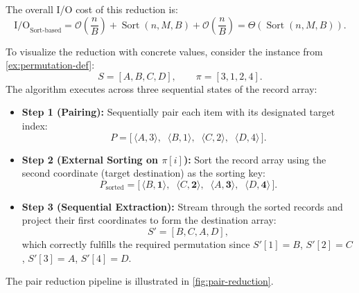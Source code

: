 The overall I/O cost of this reduction is:
\begin{equation}
  \mathrm{I/O}_{\text{Sort-based}} = \mathcal{O}\left(\frac{n}{B}\right) + \operatorname{Sort}(n, M, B) + \mathcal{O}\left(\frac{n}{B}\right) = \Theta(\operatorname{Sort}(n, M, B)).
\end{equation}

\begin{example}
\label{ex:pair-reduction-trace}
To visualize the reduction with concrete values, consider the instance from \autoref{ex:permutation-def}:
\[
  S = [A, B, C, D], \qquad \pi = [3, 1, 2, 4].
\]
The algorithm executes across three sequential states of the record array:
\begin{itemize}
  \item \textbf{Step 1 (Pairing):} Sequentially pair each item with its designated target index:
  \[
    P = \big[ \, \langle A, 3 \rangle, \;\; \langle B, 1 \rangle, \;\; \langle C, 2 \rangle, \;\; \langle D, 4 \rangle \, \big].
  \]
  \item \textbf{Step 2 (External Sorting on $\pi[i]$):} Sort the record array using the second coordinate (target destination) as the sorting key:
  \[
    P_{\text{sorted}} = \big[ \, \langle B, \mathbf{1} \rangle, \;\; \langle C, \mathbf{2} \rangle, \;\; \langle A, \mathbf{3} \rangle, \;\; \langle D, \mathbf{4} \rangle \, \big].
  \]
  \item \textbf{Step 3 (Sequential Extraction):} Stream through the sorted records and project their first coordinates to form the destination array:
  \[
    S' = [B, C, A, D],
  \]
  which correctly fulfills the required permutation since $S'[1]=B$, $S'[2]=C$, $S'[3]=A$, $S'[4]=D$.
\end{itemize}
\end{example}

The pair reduction pipeline is illustrated in \autoref{fig:pair-reduction}.

